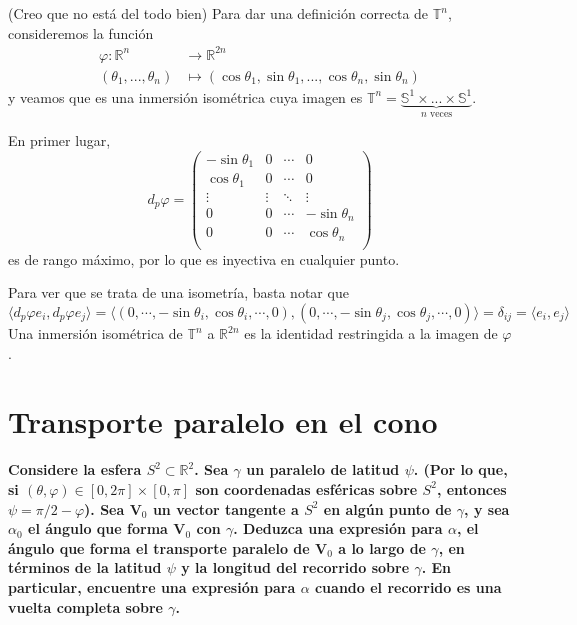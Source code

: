 \documentclass[11pt]{article}
\begin{document}
	(Creo que no está del todo bien) Para dar una definición correcta de $\mathbb{T}^n$, consideremos la función 
	\begin{align*}
		\varphi:\mathbb{R}^n&\longrightarrow\mathbb{R}^{2n}\\(\theta_1,...,\theta_n)&\mapsto(\cos{\theta_1},\sin{\theta_1},...,\cos{\theta_n},\sin{\theta_n})
	\end{align*}
	y veamos que es una inmersión isométrica cuya imagen es $\mathbb{T}^n=\underbrace{\mathbb{S}^1\times...\times\mathbb{S}^1}_{n\text{ veces}}$.\par
	En primer lugar,
	\begin{equation*}
		d_p\varphi =
		\begin{pmatrix}
			-\sin{\theta_1}& 0&\cdots&0\\
			\cos{\theta_1}&0&\cdots&0\\
			\vdots&\vdots&\ddots&\vdots\\
			0&0&\cdots&-\sin{\theta_n}\\
			0&0&\cdots&\cos{\theta_n}\\
		\end{pmatrix}
	\end{equation*}
	es de rango máximo, por lo que es inyectiva en cualquier punto.\par
	Para ver que se trata de una isometría, basta notar que
	$$\langle d_p\varphi e_i,d_p\varphi e_j\rangle=\langle (0,\cdots, -\sin{\theta_i},\cos{\theta_i},\cdots,0),(0,\cdots,-\sin{\theta_j},\cos{\theta_j},\cdots,0)\rangle=\delta_{ij}=\langle e_i,e_j\rangle$$
	Una inmersión isométrica de $\mathbb{T}^n$ a $\mathbb{R}^{2n}$ es la identidad restringida a la imagen de $\varphi$.
	
	\newpage
	\section{Transporte paralelo en el cono}
	\textbf{Considere la esfera $S^2\subset\mathbb{R}^2$. Sea $\gamma$ un paralelo de latitud $\psi$. (Por lo que, si $(\theta,\varphi)\in[0,2\pi]\times[0,\pi]$ son coordenadas esféricas sobre $S^2$, entonces $\psi=\pi/2-\varphi$). Sea $\mathbf{V}_0$ un vector tangente a $S^2$ en algún punto de $\gamma$, y sea $\alpha_0$ el ángulo que forma $\mathbf{V}_0$ con $\gamma$. Deduzca una expresión para $\alpha$, el ángulo que forma el transporte paralelo de $\mathbf{V}_0$ a lo largo de $\gamma$, en términos de la latitud $\psi$ y la longitud del recorrido sobre $\gamma$. En particular, encuentre una expresión para $\alpha$ cuando el recorrido es una vuelta completa sobre $\gamma$.}\par
	
\end{document}
